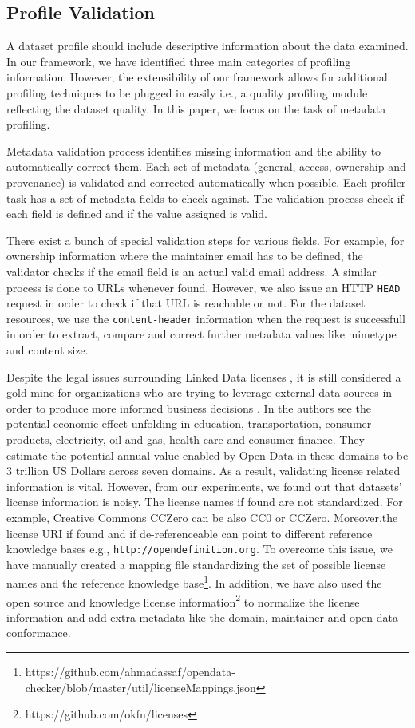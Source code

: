 \documentclass[runningheads,a4paper]{llncs}
\begin{document}
\subsection{Profile Validation}

A dataset profile should include descriptive information about the data examined. In our framework, we have identified three main categories of profiling information. However, the extensibility of our framework allows for additional profiling techniques to be plugged in easily i.e., a quality profiling module reflecting the dataset quality. In this paper, we focus on the task of metadata profiling.

Metadata validation process identifies missing information and the ability to automatically correct them. Each set of metadata (general, access, ownership and provenance) is validated and corrected automatically when possible. Each profiler task has a set of metadata fields to check against. The validation process check if each field is defined and if the value assigned is valid.

There exist a bunch of special validation steps for various fields. For example, for ownership information where the maintainer email has to be defined, the validator checks if the email field is an actual valid email address. A similar process is done to URLs whenever found. However, we also issue an HTTP \texttt{HEAD} request in order to check if that URL is reachable or not. For the dataset resources, we use the \texttt{content-header} information when the request is successfull in order to extract, compare and correct further metadata values like mimetype and content size.

Despite the legal issues surrounding Linked Data licenses \cite{nomoneyLOD}, it is still considered a gold mine for organizations who are trying to leverage external data sources in order to produce more informed business decisions \cite{Boyd2011}. In \cite{mckinseyreport} the authors see the potential economic effect unfolding in education, transportation, consumer products, electricity, oil and gas, health care and consumer finance. They estimate the potential annual value enabled by Open Data in these domains to be 3 trillion US Dollars across seven domains. As a result, validating license related information is vital. However, from our experiments, we found out that datasets' license information is noisy. The license names if found are not standardized. For example, Creative Commons CCZero can be also CC0 or CCZero. Moreover,the license URI if found and if de-referenceable can point to different reference knowledge bases e.g., \texttt{http://opendefinition.org}. To overcome this issue, we have manually created a mapping file standardizing the set of possible license names and the reference knowledge base\footnote{https://github.com/ahmadassaf/opendata-checker/blob/master/util/licenseMappings.json}. In addition, we have also used the open source and knowledge license information\footnote{https://github.com/okfn/licenses} to normalize the license information and add extra metadata like the domain, maintainer and open data conformance.
\end{document}
